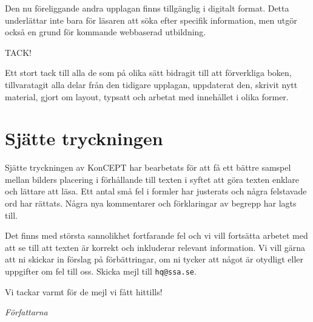 Den nu föreliggande andra upplagan finns tillgänglig i digitalt format.
Detta underlättar inte bara för läsaren att söka efter specifik information,
men utgör också en grund för kommande webbaserad utbildning.

TACK!

Ett stort tack till alla de som på olika sätt bidragit till att förverkliga
boken, tillvaratagit alla delar från den tidigare upplagan, uppdaterat
den, skrivit nytt material, gjort om layout, typsatt och arbetat med
innehållet i olika former.

\section*{Sjätte tryckningen}

Sjätte tryckningen av KonCEPT har bearbetats för att få ett bättre samspel mellan
bilders placering i förhållande till texten i syftet att göra texten enklare och
lättare att läsa.
Ett antal små fel i formler har justerats och några felstavade ord har rättats.
Några nya kommentarer och förklaringar av begrepp har lagts till.

Det finns med största sannolikhet fortfarande fel och vi vill fortsätta arbetet
med att se till att texten är korrekt och inkluderar relevant information.
Vi vill gärna att ni skickar in förslag på förbättringar, om ni tycker att något
är otydligt eller uppgifter om fel till oss.
Skicka mejl till \texttt{hq@ssa.se}.

\medskip

Vi tackar varmt för de mejl vi fått hittills!

\bigskip

\noindent\emph{Författarna}
